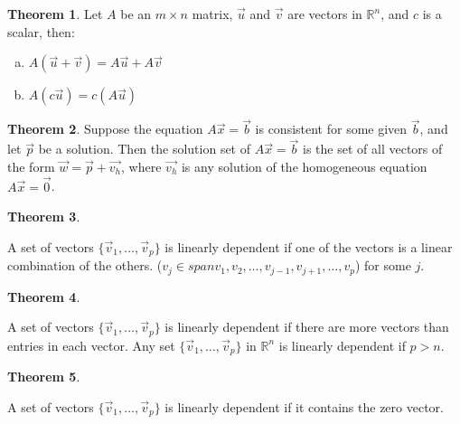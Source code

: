 \documentclass[a4paper,12pt]{article}
\theoremstyle{definition}
\newtheorem{theorem}{Theorem}
\theoremstyle{definition}
\newcommand{\finitevecs}[2]{#1_1,\ldots,#1_#2}
\newcommand{\finitevecsset}[2]{\{\finitevecs{#1}{#2}\}}
\begin{document}
	\begin{theorem}
		\label{thm:A-x-b-props}
		Let $A$ be an $m \times n$ matrix, $\vec{u}$ and $\vec{v}$ are vectors in $\mathbb{R}^n$, and $c$ is a scalar, then:
		
		\begin{enumerate}[a.]
			\item $A(\vec{u} + \vec{v}) = A\vec{u} + A\vec{v}$
			
			\item $A(c\vec{u}) = c(A\vec{u})$
		\end{enumerate}
	\end{theorem}
	
	\begin{theorem}
		\label{thm:non-homo-thm}
		Suppose the equation $A\vec{x} = \vec{b}$ is consistent for some given $\vec{b}$, and let $\vec{p}$ be a
		solution. Then the solution set of $A\vec{x} = \vec{b}$ is the set of all vectors of the form
		$\vec{w} = \vec{p} + \vec{v_h}$, where $\vec{v_h}$ is any solution of the homogeneous equation $A\vec{x} = \vec{0}$.
	\end{theorem}
	
	\begin{theorem}
		\label{thm:lin-dep-thm}
		
		A set of vectors $\finitevecsset{\vec{v}}{p}$ is linearly dependent if one of the vectors is a linear combination of the others. ($v_j \in span{v_1, v_2,\ldots,v_{j-1}, v_{j+1},\ldots,v_p}$) for some $j$.
	\end{theorem}
	
	\begin{theorem}
		\label{thm:lin-dep-thm-p-gt-n}
		
		A set of vectors $\finitevecsset{\vec{v}}{p}$ is linearly dependent if there are more vectors than entries in each vector. Any set $\finitevecsset{\vec{v}}{p}$ in $\mathbb{R}^n$ is linearly dependent if $p > n$.
	\end{theorem}
	
	\begin{theorem}
		\label{thm:lin-dep-thm-zero-vec}
		
		A set of vectors $\finitevecsset{\vec{v}}{p}$ is linearly dependent if it contains the zero vector.
	\end{theorem}
	
\end{document}
